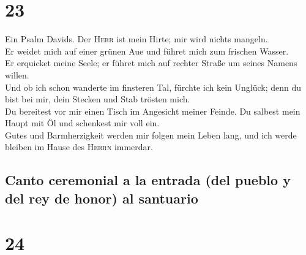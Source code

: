 \hypertarget{section-22}{%
\section{23}\label{section-22}}

 Ein Psalm Davids. Der \textsc{Herr} ist mein Hirte; mir
wird nichts mangeln.\\
 Er weidet mich auf einer grünen Aue und führet mich zum
frischen Wasser.\\
 Er erquicket meine Seele; er führet mich auf rechter
Straße um seines Namens willen.\\
 Und ob ich schon wanderte im finsteren Tal, fürchte ich
kein Unglück; denn du bist bei mir, dein Stecken und Stab trösten
mich.\\
 Du bereitest vor mir einen Tisch im Angesicht meiner
Feinde. Du salbest mein Haupt mit Öl und schenkest mir voll ein.\\
 Gutes und Barmherzigkeit werden mir folgen mein Leben
lang, und ich werde bleiben im Hause des \textsc{Herrn} immerdar.

\hypertarget{canto-ceremonial-a-la-entrada-del-pueblo-y-del-rey-de-honor-al-santuario}{%
\subsection{Canto ceremonial a la entrada (del pueblo y del rey de
honor) al
santuario}\label{canto-ceremonial-a-la-entrada-del-pueblo-y-del-rey-de-honor-al-santuario}}

\hypertarget{section-23}{%
\section{24}\label{section-23}}

